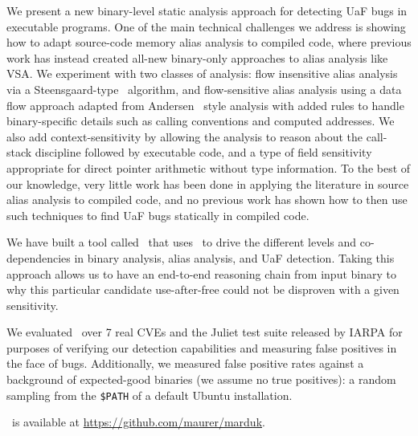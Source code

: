 We present a new binary-level static analysis approach for detecting UaF bugs in executable programs.
One of the main technical challenges we address is showing how to adapt source-code memory alias analysis to compiled code, where previous work has instead created all-new binary-only approaches to alias
analysis like VSA.
We experiment with two classes of analysis: flow insensitive alias analysis via a Steensgaard-type~\cite{steensgaard-alias} algorithm, and  flow-sensitive alias analysis using a data flow approach adapted from Andersen~\cite{andersen} style analysis with added rules to handle binary-specific details such as calling conventions and computed addresses.
We also add context-sensitivity by allowing the analysis to reason about the call-stack discipline followed by executable code, and a type of field sensitivity appropriate for direct pointer arithmetic without type information.
To the best of our knowledge, very little work has been done in applying the literature in source alias analysis to compiled code, and no previous work has shown how to then use such techniques to find UaF bugs statically in compiled code.

We have built a tool called \aliasname\ that uses \sysname\ to drive the different levels and co-dependencies in binary analysis, alias analysis, and UaF detection.
Taking this approach allows us to have an end-to-end reasoning chain from input binary to why this particular candidate use-after-free could not be disproven with a given sensitivity.

We evaluated \aliasname\ over 7 real CVEs and the Juliet test suite released by IARPA for purposes of verifying our detection capabilities and measuring false positives in the face of bugs.
Additionally, we measured false positive rates against a background of expected-good binaries (we assume no true positives): a random sampling from the \texttt{\$PATH} of a default Ubuntu installation.

\aliasname\ is available at \url{https://github.com/maurer/marduk}.
